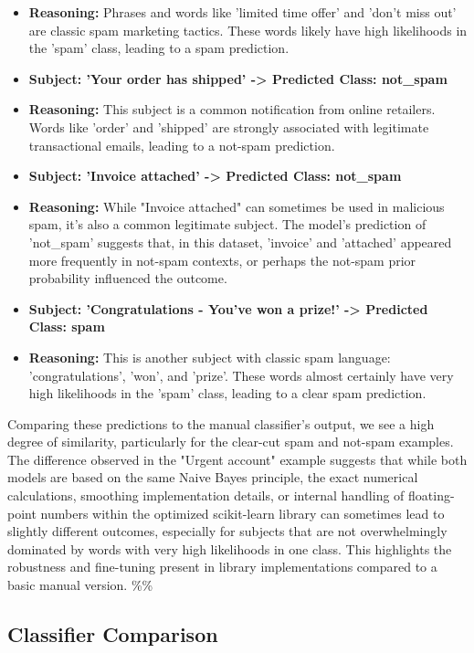 \documentclass[12pt,a4paper]{article}
\begin{document}
\begin{itemize}
    \item \textbf{Reasoning:} Phrases and words like 'limited time offer' and 'don't miss out' are classic spam marketing tactics. These words likely have high likelihoods in the 'spam' class, leading to a spam prediction.
    \item \textbf{Subject: 'Your order has shipped' -> Predicted Class: not\_spam}
    \item \textbf{Reasoning:} This subject is a common notification from online retailers. Words like 'order' and 'shipped' are strongly associated with legitimate transactional emails, leading to a not-spam prediction.
    \item \textbf{Subject: 'Invoice attached' -> Predicted Class: not\_spam}
    \item \textbf{Reasoning:} While "Invoice attached" can sometimes be used in malicious spam, it's also a common legitimate subject. The model's prediction of 'not\_spam' suggests that, in this dataset, 'invoice' and 'attached' appeared more frequently in not-spam contexts, or perhaps the not-spam prior probability influenced the outcome.
    \item \textbf{Subject: 'Congratulations - You've won a prize!' -> Predicted Class: spam}
    \item \textbf{Reasoning:} This is another subject with classic spam language: 'congratulations', 'won', and 'prize'. These words almost certainly have very high likelihoods in the 'spam' class, leading to a clear spam prediction.
\end{itemize}

Comparing these predictions to the manual classifier's output, we see a high degree of similarity, particularly for the clear-cut spam and not-spam examples. The difference observed in the "Urgent account" example suggests that while both models are based on the same Naive Bayes principle, the exact numerical calculations, smoothing implementation details, or internal handling of floating-point numbers within the optimized scikit-learn library can sometimes lead to slightly different outcomes, especially for subjects that are not overwhelmingly dominated by words with very high likelihoods in one class. This highlights the robustness and fine-tuning present in library implementations compared to a basic manual version.
\%\%


\subsection{Classifier Comparison}
\end{document}
